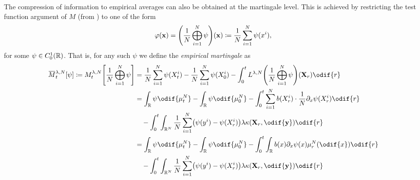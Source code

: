 The compression of information to empirical averages can also be obtained at the martingale level.
This is achieved by restricting the test function argument of \(M\) (from ) to one of the form
\begin{equation}
  \varphi(\bm{x}) = \br*{ \frac{1}{N} \bigoplus_{i=1}^N  \psi }(\bm{x})
  \coloneqq \frac{1}{N} \sum_{i=1}^N \psi(x^i),
\end{equation}
for some \(\psi \in C_0^1(\mathbb{R})\).
That is, for any such \( \psi \) we define the \textit{empirical martingale} as
\begin{equation}\label{eq:emp-M-derivation-start}
  \begin{split}
    \ol{M}_t^{\lambda, N}[\psi] \coloneqq
    M_t^{\lambda, N}\sbr*{\frac{1}{N} \bigoplus_{i=1}^N \psi}
     & = \frac{1}{N} \sum_{i=1}^N \psi(X_t^i) - \frac{1}{N} \sum_{i=1}^N \psi(X_0^i) - \int_0^t L^{\lambda, N} \br*{\frac{1}{N}\bigoplus_{i=1}^N \psi} (\bm{X}_r) \odif{r} \\
     & = \int_\potspace \psi \odif{\mu_t^N} - \int_\potspace \psi \odif{\mu_0^N}
    - \int_0^t \sum_{i=1}^N b(X_{r}^i) \cdot \frac{1}{N} \partial_{x} \psi(X_{r}^i) \odif{r}                                                                               \\
     & \quad - \int_0^t \int_{\potspace^N} \frac{1}{N} \sum_{i=1}^N \br*{ \psi(y^i) - \psi(X_{r}^i) } \lambda \kappa(\bm{X}_r, \odif{\bm{y}}) \odif{r}                     \\
     & = \int_\potspace \psi \odif{\mu_t^N} - \int_\potspace \psi \odif{\mu_0^N}
    - \int_0^t \int_\potspace b(x) \partial_{x} \psi(x) \mu_r^N(\odif{x}) \odif{r}                                                                              \\
     & \quad - \int_0^t \int_{\potspace^N} \frac{1}{N} \sum_{i=1}^N \br*{ \psi(y^i) - \psi(X_{r}^i) } \lambda \kappa(\bm{X}_r, \odif{\bm{y}}) \odif{r}                     \\
  \end{split}
\end{equation}
